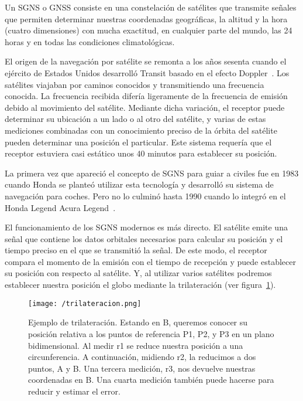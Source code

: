 Un \acs{SGNS} o \acs{GNSS} consiste en una constelación de satélites que transmite señales que
permiten determinar nuestras coordenadas geográficas, la altitud y la hora (cuatro dimensiones) con
mucha exactitud, en cualquier parte del mundo, las 24 horas y en todas las condiciones
climatológicas.

El origen de la navegación por satélite se remonta a los años sesenta cuando el ejército de Estados
Unidos desarrolló Transit basado en el efecto Doppler~\cite{SN}. Los satélites viajaban por caminos
conocidos y transmitiendo una frecuencia conocida. La frecuencia recibida difería ligeramente de la
frecuencia de emisión debido al movimiento del satélite. Mediante dicha variación, el receptor puede
determinar su ubicación a un lado o al otro del satélite, y varias de estas mediciones combinadas
con un conocimiento preciso de la órbita del satélite pueden determinar una posición el
particular. Este sistema requería que el receptor estuviera casi estático unos 40 minutos para
establecer su posición.

La primera vez que apareció el concepto de \acs{SGNS} para guiar a civiles fue en 1983 cuando Honda
se planteó utilizar esta tecnología y desarrolló su sistema de navegación para coches. Pero no lo
culminó hasta 1990 cuando lo integró en el Honda Legend Acura Legend~\cite{Parra13}.

El funcionamiento de los \acs{SGNS} modernos es más directo. El satélite emite una señal que
contiene los datos orbitales necesarios para calcular su posición y el tiempo preciso en el que se
transmitió la señal. De este modo, el receptor compara el momento de la emisión con el tiempo de
recepción y puede establecer su posición con respecto al satélite. Y, al utilizar varios satélites
podremos establecer nuestra posición el globo mediante la trilateración (ver
figura~\ref{fig:trilateracion}).

\begin{figure}[!h]
  \begin{center}
    \texttt{[image: /trilateracion.png]}
    \caption{Ejemplo de trilateración. Estando en B, queremos conocer su posición relativa a los
      puntos de referencia P1, P2, y P3 en un plano bidimensional. Al medir r1 se reduce nuestra
      posición a una circunferencia. A continuación, midiendo r2, la reducimos a dos puntos, A y
      B. Una tercera medición, r3, nos devuelve nuestras coordenadas en B. Una cuarta medición
      también puede hacerse para reducir y estimar el error.}
    \label{fig:trilateracion}
  \end{center}
\end{figure}

